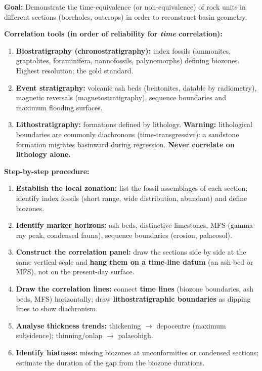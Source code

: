\documentclass[11pt]{article}
\newcommand{\cle}[1]{{\popxbold\color{popdark}#1}}
\begin{document}
\begin{methode}
\textbf{Goal:} Demonstrate the time-equivalence (or non-equivalence) of rock units in different sections (boreholes, outcrops) in order to reconstruct basin geometry.

\textbf{Correlation tools (in order of reliability for \emph{time} correlation):}
\begin{enumerate}
    \item \textbf{Biostratigraphy (chronostratigraphy):} \cle{index fossils} (ammonites, graptolites, foraminifera, nannofossils, palynomorphs) defining \cle{biozones}. Highest resolution; the gold standard.
    \item \textbf{Event stratigraphy:} volcanic ash beds (bentonites, datable by radiometry), magnetic reversals (magnetostratigraphy), sequence boundaries and maximum flooding surfaces.
    \item \textbf{Lithostratigraphy:} formations defined by lithology. \textbf{Warning:} lithological boundaries are commonly \cle{diachronous} (time-transgressive): a sandstone formation migrates basinward during regression. \textbf{Never correlate on lithology alone.}
\end{enumerate}

\textbf{Step-by-step procedure:}
\begin{enumerate}
    \item \textbf{Establish the local zonation:} list the fossil assemblages of each section; identify index fossils (short range, wide distribution, abundant) and define biozones.
    \item \textbf{Identify marker horizons:} ash beds, distinctive limestones, MFS (gamma-ray peak, condensed fauna), sequence boundaries (erosion, palaeosol).
    \item \textbf{Construct the correlation panel:} draw the sections side by side at the same vertical scale and \textbf{hang them on a time-line datum} (an ash bed or MFS), not on the present-day surface.
    \item \textbf{Draw the correlation lines:} connect \textbf{time lines} (biozone boundaries, ash beds, MFS) horizontally; draw \textbf{lithostratigraphic boundaries} as dipping lines to show diachronism.
    \item \textbf{Analyse thickness trends:} thickening $\rightarrow$ depocentre (maximum subsidence); thinning/onlap $\rightarrow$ palaeohigh.
    \item \textbf{Identify hiatuses:} missing biozones at unconformities or condensed sections; estimate the duration of the gap from the biozone durations.
\end{enumerate}


\end{methode}
\end{document}
